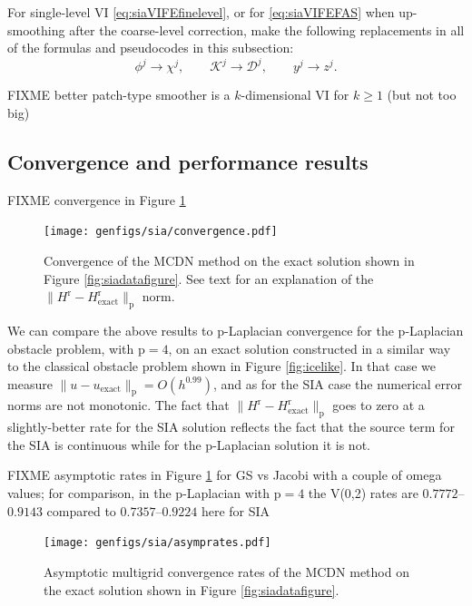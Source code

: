 \documentclass[letterpaper,final,12pt,reqno]{amsart}
\theoremstyle{claim}
\newcommand{\pp}{{\text{p}}}
\newcommand{\rr}{{\text{r}}}
\numberwithin{equation}{section}
\numberwithin{figure}{section}
\numberwithin{table}{section}
\numberwithin{theorem}{section}
\begin{document}
For single-level VI \eqref{eq:siaVIFEfinelevel}, or for \eqref{eq:siaVIFEFAS} when up-smoothing after the coarse-level correction, make the following replacements in all of the formulas and pseudocodes in this subsection:
\begin{equation}
   \phi^j \to \chi^j, \qquad \mathcal{K}^j \to \mathcal{D}^j, \qquad y^j \to z^j.  \label{eq:pngssinglelevelreplacements}
\end{equation}

FIXME better patch-type smoother is a $k$-dimensional VI for $k\ge 1$ (but not too big)

\subsection{Convergence and performance results} \label{subsec:siaperformance}  FIXME convergence in Figure \ref{fig:siaconv}

\begin{figure}
\texttt{[image: genfigs/sia/convergence.pdf]}
\caption{Convergence of the MCDN method on the exact solution shown in Figure \ref{fig:siadatafigure}.  See text for an explanation of the $\|H^\rr-H_{\text{exact}}^\rr\|_\pp$ norm.}
\label{fig:siaconv}
\end{figure}

We can compare the above results to $\pp$-Laplacian convergence for the $\pp$-Laplacian obstacle problem, with $\pp=4$, on an exact solution constructed in a similar way to the classical obstacle problem shown in Figure \ref{fig:icelike}.  In that case we measure $\|u-u_{\text{exact}}\|_\pp=O(h^{0.99})$, and as for the SIA case the numerical error norms are not monotonic.  The fact that $\|H^\rr-H_{\text{exact}}^\rr\|_\pp$ goes to zero at a slightly-better rate for the SIA solution reflects the fact that the source term for the SIA is continuous while for the $\pp$-Laplacian solution it is not.

FIXME asymptotic rates in Figure \ref{fig:siaconv} for GS vs Jacobi with a couple of omega values; for comparison, in the $\pp$-Laplacian with $\pp=4$ the V(0,2) rates are $0.7772$--$0.9143$ compared to $0.7357$--$0.9224$ here for SIA

\begin{figure}
\texttt{[image: genfigs/sia/asymprates.pdf]}
\caption{Asymptotic multigrid convergence rates of the MCDN method on the exact solution shown in Figure \ref{fig:siadatafigure}.}
\label{fig:siaasymp}
\end{figure}
\end{document}
